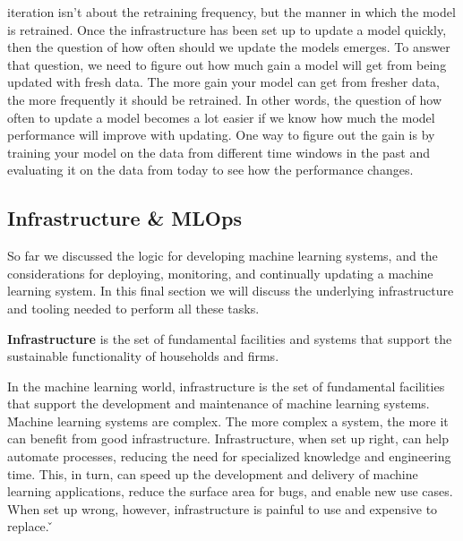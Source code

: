 iteration isn't about the retraining frequency, but the manner in which the model is retrained. Once the
infrastructure has been set up to update a model quickly, then the question of how often should we update the models
emerges. To answer that question, we need to figure out how much gain a model will get from being updated with fresh
data. The more gain your model can get from fresher data, the more frequently it should be retrained. In other words,
the question of how often to update a model becomes a lot easier if we know how much the model performance will
improve with updating. One way to figure out the gain is by training your model on the data from different time
windows in the past and evaluating it on the data from today to see how the performance changes.

\subsection{Infrastructure \& MLOps}

So far we discussed the logic for developing machine learning systems, and the considerations for deploying,
monitoring, and continually updating a machine learning system. In this final section we will discuss the underlying
infrastructure and tooling needed to perform all these tasks.

\bd[Infrastructure]
\textbf{Infrastructure} is the set of fundamental facilities and systems that support the sustainable functionality of
households and firms.
\ed

In the machine learning world, infrastructure is the set of fundamental facilities that support the development and
maintenance of machine learning systems. \v

Machine learning systems are complex. The more complex a system, the more it can benefit from good infrastructure.
Infrastructure, when set up right, can help automate processes, reducing the need for specialized knowledge and
engineering time. This, in turn, can speed up the development and delivery of machine learning applications, reduce
the surface area for bugs, and enable new use cases. When set up wrong, however, infrastructure is painful to use and
expensive to replace. \v

